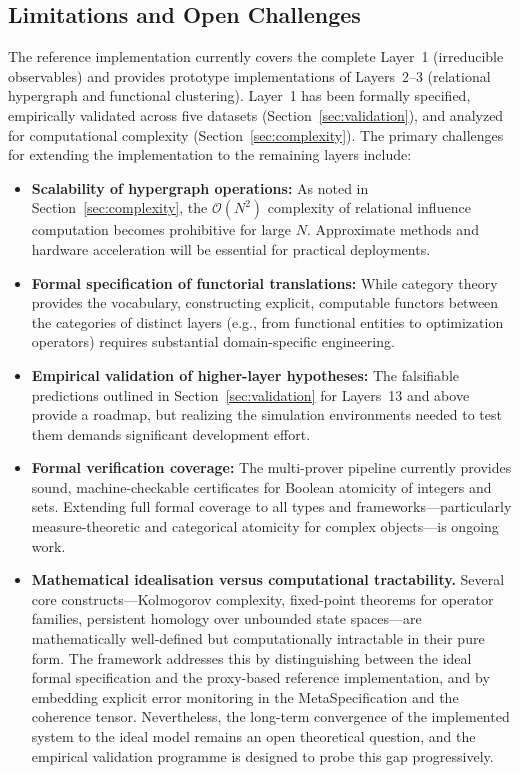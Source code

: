 \subsection{Limitations and Open Challenges}

The reference implementation currently covers the complete Layer~1 (irreducible observables) and provides prototype implementations of Layers~2--3 (relational hypergraph and functional clustering). Layer~1 has been formally specified, empirically validated across five datasets (Section~\ref{sec:validation}), and analyzed for computational complexity (Section~\ref{sec:complexity}). The primary challenges for extending the implementation to the remaining layers include:

\begin{itemize}
    \item \textbf{Scalability of hypergraph operations:} As noted in Section~\ref{sec:complexity}, the $\mathcal{O}(N^2)$ complexity of relational influence computation becomes prohibitive for large $N$. Approximate methods and hardware acceleration will be essential for practical deployments.
    \item \textbf{Formal specification of functorial translations:} While category theory provides the vocabulary, constructing explicit, computable functors between the categories of distinct layers (e.g., from functional entities to optimization operators) requires substantial domain-specific engineering.
    \item \textbf{Empirical validation of higher-layer hypotheses:} The falsifiable predictions outlined in Section~\ref{sec:validation} for Layers~13 and above provide a roadmap, but realizing the simulation environments needed to test them demands significant development effort.
    \item \textbf{Formal verification coverage:} The multi-prover pipeline currently provides sound, machine-checkable certificates for Boolean atomicity of integers and sets. Extending full formal coverage to all types and frameworks---particularly measure-theoretic and categorical atomicity for complex objects---is ongoing work.
    \item \textbf{Mathematical idealisation versus computational tractability.} Several core constructs---Kolmogorov complexity, fixed-point theorems for operator families, persistent homology over unbounded state spaces---are mathematically well-defined but computationally intractable in their pure form. The framework addresses this by distinguishing between the ideal formal specification and the proxy-based reference implementation, and by embedding explicit error monitoring in the MetaSpecification and the coherence tensor. Nevertheless, the long-term convergence of the implemented system to the ideal model remains an open theoretical question, and the empirical validation programme is designed to probe this gap progressively.

\end{itemize}
